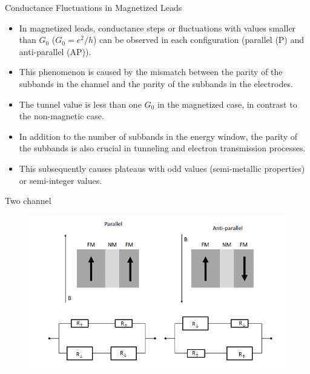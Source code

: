 \documentclass[handout,t]{beamer}
\begin{document}
\begin{frame}{Conductance Fluctuations in Magnetized Leads}
	\begin{itemize}
		\item In magnetized leads, conductance steps or fluctuations with values smaller than $G_0$ ($G_0 = e^2/h$) can be observed in each configuration (parallel (P) and anti-parallel (AP)).
		\item This phenomenon is caused by the mismatch between the parity of the subbands in the channel and the parity of the subbands in the electrodes.
		\item The tunnel value is less than one $G_0$ in the magnetized case, in contrast to the non-magnetic case.
		\item In addition to the number of subbands in the energy window, the parity of the subbands is also crucial in tunneling and electron transmission processes.
		\item This subsequently causes plateaus with odd values (semi-metallic properties) or semi-integer values.
	\end{itemize}
\end{frame}
\begin{frame}{Two channel}
	\begin{figure}[!ht]
		\centering
		\includegraphics[width=\linewidth]{../figures/twochannelmodel.png}
		\label{fig:twochannelmodel}
	\end{figure}
\end{frame}
\end{document}
